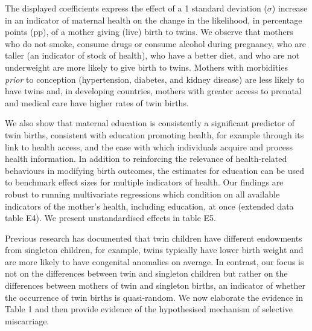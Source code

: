 \documentclass{nature}
\begin{document}
\begin{linenumbers}
The displayed coefficients express the effect of a 1 standard deviation ($\sigma$) increase in an indicator of maternal health on the change in the likelihood, in percentage points (pp), of a mother giving (live) birth to twins. %
We observe that mothers who do not smoke, consume drugs or consume alcohol during pregnancy, who are taller (an indicator of stock of health\cite{Silventoinen2003,BhalotraRawlings2013}), who have a better diet, and who are not underweight are more likely to give birth to twins. Mothers with morbidities \emph{prior} to conception (hypertension, diabetes, and kidney disease) are less likely to have twins and, in developing countries, mothers with greater access to prenatal and medical care have higher rates of twin births. 

We also show that maternal education is consistently a significant predictor of twin births, consistent with education promoting health, for example through its link to health access, and the ease with which individuals acquire and process health information\cite{Kenkel1991,CutlerLlerasMuney2010}. In addition to reinforcing the relevance of health-related behaviours in modifying birth outcomes, the estimates for education can be used to benchmark effect sizes for multiple indicators of health. Our findings are robust to running multivariate regressions which condition on all available indicators of the mother's health, including education, at once (extended data table E4). We present unstandardised effects in table E5.

Previous research has documented that twin children have different endowments from singleton children, for example, twins typically have lower birth weight and are more likely to have congenital anomalies on average\cite{Hall2003}. In contrast, our focus is not on the differences between twin and singleton children but rather on the differences between mothers of twin and singleton births, an indicator of whether the occurrence of twin births is quasi-random. We now elaborate the evidence in Table 1 and then provide evidence of the hypothesised mechanism of selective miscarriage.


\end{linenumbers}
\end{document}
